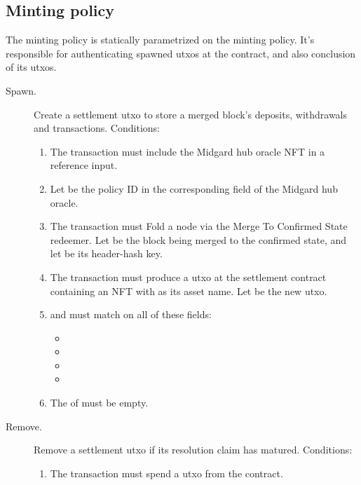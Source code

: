 \documentclass[../midgard.tex]{subfiles}
\begin{document}
\subsection{Minting policy}
\label{h:settlement-minting-policy}

The  minting policy is statically parametrized on the  minting policy.
It's responsible for authenticating spawned utxos at the  contract, and also conclusion of its utxos.
\begin{description}
  \item[Spawn.] Create a settlement utxo to store a merged block's deposits, withdrawals and transactions.
    Conditions:
      \begin{enumerate}
        \item The transaction must include the Midgard hub oracle NFT in a reference input.
        \item Let  be the policy ID in the corresponding field of the Midgard hub oracle.
        \item The transaction must Fold a  node via the Merge To Confirmed State redeemer.
          Let  be the block being merged to the confirmed state, and let  be its header-hash key.
        \item The transaction must produce a utxo at the settlement contract containing an NFT with  as its asset name.
          Let  be the new utxo.
        \item {} and  must match on all of these fields:
          \begin{itemize}
            \item {}
            \item {}
            \item {}
            \item {}
          \end{itemize}
        \item The  of  must be empty.
      \end{enumerate}
  \item[Remove.] Remove a settlement utxo if its resolution claim has matured.
    Conditions:
      \begin{enumerate}
        \item The transaction must spend a utxo from the  contract.

\end{enumerate}
\end{description}
\end{document}
